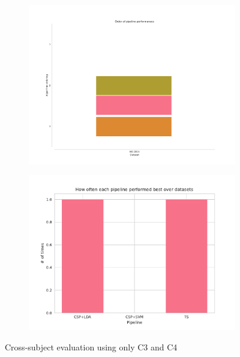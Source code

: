\begin{figure}
    \begin{subfigure}[h]{0.45\textwidth}
        \includegraphics[width=\textwidth]{./CrossSubjectEvaluation_C3C4/ordering.pdf}
    \end{subfigure}
    \begin{subfigure}[h]{0.45\textwidth}
        \includegraphics[width=\textwidth]{./CrossSubjectEvaluation_C3C4/summary.pdf}
    \end{subfigure}
    \caption{Cross-subject evaluation using only C3 and C4}
\end{figure}
